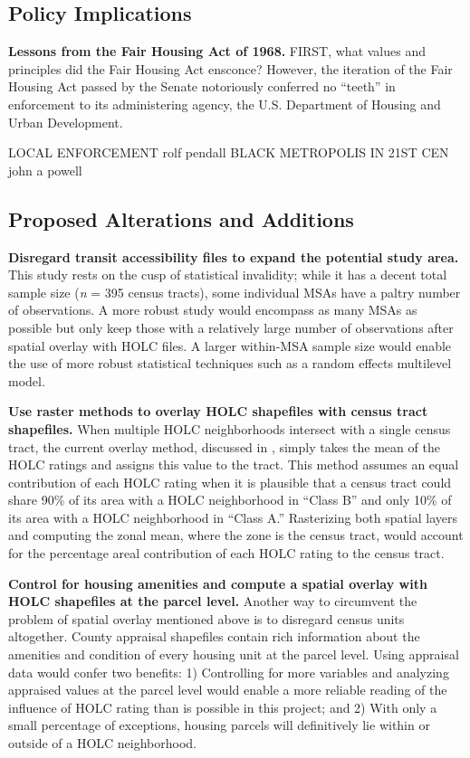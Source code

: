 \documentclass[paper=letter, fontsize=12pt]{scrartcl} %
\begin{document}
\subsection{Policy Implications}
\textbf{Lessons from the Fair Housing Act of 1968.} FIRST, what values and principles did the Fair Housing Act ensconce? However, the iteration of the Fair Housing Act passed by the Senate notoriously conferred no ``teeth'' in enforcement to its administering agency, the U.S. Department of Housing and Urban Development. \par

LOCAL ENFORCEMENT rolf pendall BLACK METROPOLIS IN 21ST CEN john a powell



\subsection{Proposed Alterations and Additions}
\textbf{Disregard transit accessibility files to expand the potential study area.} This study rests on the cusp of statistical invalidity; while it has a decent total sample size (\textit{n} = 395 census tracts), some individual MSAs have a paltry number of observations. A more robust study would encompass as many MSAs as possible but only keep those with a relatively large number of observations after spatial overlay with HOLC files. A larger within-MSA sample size would enable the use of more robust statistical techniques such as a random effects multilevel model.\par
\textbf{Use raster methods to overlay HOLC shapefiles with census tract shapefiles.} When multiple HOLC neighborhoods intersect with a single census tract, the current overlay method, discussed in , simply takes the mean of the HOLC ratings and assigns this value to the tract. This method assumes an equal contribution of each HOLC rating when it is plausible that a census tract could share 90\% of its area with a HOLC neighborhood in ``Class B'' and only 10\% of its area with a HOLC neighborhood in ``Class A.'' Rasterizing both spatial layers and computing the zonal mean, where the zone is the census tract, would account for the percentage areal contribution of each HOLC rating to the census tract. \par
\textbf{Control for housing amenities and compute a spatial overlay with HOLC shapefiles at the parcel level.} Another way to circumvent the problem of spatial overlay mentioned above is to disregard census units altogether. County appraisal shapefiles contain rich information about the amenities and condition of every housing unit at the parcel level. Using appraisal data would confer two benefits: 1) Controlling for more variables and analyzing appraised values at the parcel level would enable a more reliable reading of the influence of HOLC rating than is possible in this project; and 2) With only a small percentage of exceptions, housing parcels will definitively lie within or outside of a HOLC neighborhood.
\end{document}
